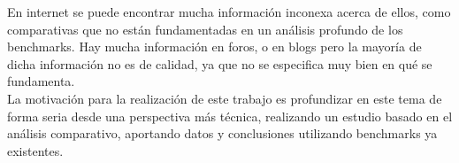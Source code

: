 En internet se puede encontrar mucha información inconexa acerca de ellos, como comparativas que no están fundamentadas en un análisis profundo de los benchmarks. Hay mucha información en foros, o en blogs pero la mayoría de dicha información no es de calidad, ya que no se especifica muy bien en qué se fundamenta.\\

La motivación para la realización de este trabajo es profundizar en este tema de forma seria desde una perspectiva más técnica, realizando un estudio basado en el análisis comparativo, aportando datos y conclusiones utilizando benchmarks ya existentes. 


